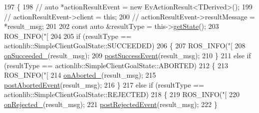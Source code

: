 \begin{DoxyCode}
197     \{
198         \textcolor{comment}{// auto *actionResultEvent = new EvActionResult<TDerived>();}
199         \textcolor{comment}{// actionResultEvent->client = this;}
200         \textcolor{comment}{// actionResultEvent->resultMessage = *result\_msg;}
201 
202         \textcolor{keyword}{const} \textcolor{keyword}{auto} &resultType = this->\hyperlink{classsmacc_1_1client__bases_1_1SmaccActionClientBase_a97192acd7bb7cac5de0191e700ab72ee}{getState}();
203         ROS\_INFO(\textcolor{stringliteral}{"[%
204 
205         \textcolor{keywordflow}{if} (resultType == actionlib::SimpleClientGoalState::SUCCEEDED)
206         \{
207             ROS\_INFO(\textcolor{stringliteral}{"[%
208             \hyperlink{classsmacc_1_1client__bases_1_1SmaccActionClientBase_afa1d615e16c9e825d815a3a3ccaa61df}{onSucceeded\_}(result\_msg);
209             \hyperlink{classsmacc_1_1client__bases_1_1SmaccActionClientBase_afb4f82508cd653d496392f321e84a783}{postSuccessEvent}(result\_msg);
210         \}
211         \textcolor{keywordflow}{else} \textcolor{keywordflow}{if} (resultType == actionlib::SimpleClientGoalState::ABORTED)
212         \{
213             ROS\_INFO(\textcolor{stringliteral}{"[%
214             \hyperlink{classsmacc_1_1client__bases_1_1SmaccActionClientBase_adc33748ca4fcef9730f8039b75d496d0}{onAborted\_}(result\_msg);
215             \hyperlink{classsmacc_1_1client__bases_1_1SmaccActionClientBase_a9ca2952ededeec233ee6d8a9a39c680b}{postAbortedEvent}(result\_msg);
216         \}
217         \textcolor{keywordflow}{else} \textcolor{keywordflow}{if} (resultType == actionlib::SimpleClientGoalState::REJECTED)
218         \{
219             ROS\_INFO(\textcolor{stringliteral}{"[%
220             \hyperlink{classsmacc_1_1client__bases_1_1SmaccActionClientBase_a4c878cbf2684701323e2b36668f7d721}{onRejected\_}(result\_msg);
221             \hyperlink{classsmacc_1_1client__bases_1_1SmaccActionClientBase_a04cb60c48127e5534c1ce7045fb5abdc}{postRejectedEvent}(result\_msg);
222         \}
}}}}
\end{DoxyCode}
